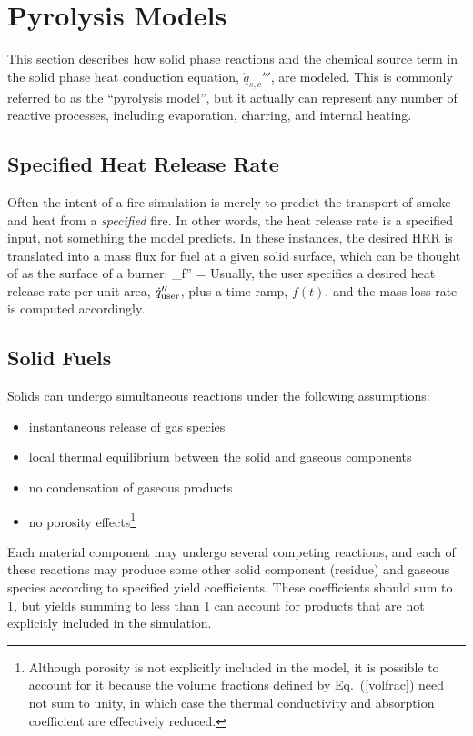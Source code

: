 

\newpage
\section{Pyrolysis Models}
\label{pyrosection}

This section describes how solid phase reactions and the chemical source term in the solid phase heat conduction equation, $\dot{q}_{s,c}'''$,  are modeled. This is commonly referred to as the ``pyrolysis model'', but it actually can represent any number of reactive processes, including evaporation, charring, and internal heating.


\subsection{Specified Heat Release Rate}

Often the intent of a fire simulation is merely to predict the transport of smoke and heat from a {\em specified} fire. In other words, the heat release rate is a specified input, not something the model predicts. In these instances, the desired HRR is translated into a mass flux for fuel at a given solid surface, which can be thought of as the surface of a burner:
\be
   \dm_{\rm f}'' = 
\ee
Usually, the user specifies a desired heat release rate per unit area, $\dot{q}_{\rm user}''$, plus a time ramp, $f(t)$, and the mass loss rate is computed accordingly.

\subsection{Solid Fuels}

Solids can undergo simultaneous reactions under the following assumptions:
\begin{itemize}
\setlength{\itemsep}{0.0in}
\item instantaneous release of gas species
\item local thermal equilibrium between the solid and gaseous components
\item no condensation of gaseous products
\item no porosity effects\footnote{Although porosity is not explicitly included in the model, it is possible to account for it because the volume fractions defined by Eq.~(\ref{volfrac}) need not sum to unity, in which case the thermal conductivity and absorption coefficient are effectively reduced.}
\end{itemize}
Each material component may undergo several competing reactions, and each of these reactions may produce some other solid component (residue) and gaseous species according to specified yield coefficients.  These coefficients should sum to 1, but yields summing to less than 1 can account for products that are not explicitly included in the simulation.

